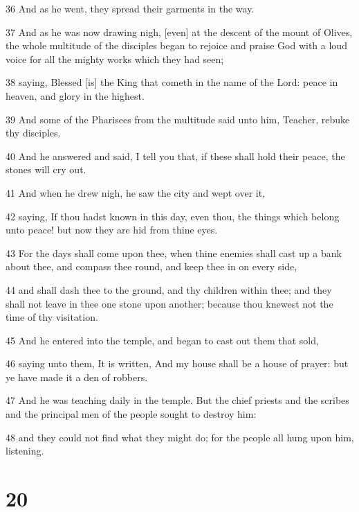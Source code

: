 \par 36 And as he went, they spread their garments in the way.
\par 37 And as he was now drawing nigh, [even] at the descent of the mount of Olives, the whole multitude of the disciples began to rejoice and praise God with a loud voice for all the mighty works which they had seen;
\par 38 saying, Blessed [is] the King that cometh in the name of the Lord: peace in heaven, and glory in the highest.
\par 39 And some of the Pharisees from the multitude said unto him, Teacher, rebuke thy disciples.
\par 40 And he answered and said, I tell you that, if these shall hold their peace, the stones will cry out.
\par 41 And when he drew nigh, he saw the city and wept over it,
\par 42 saying, If thou hadst known in this day, even thou, the things which belong unto peace! but now they are hid from thine eyes.
\par 43 For the days shall come upon thee, when thine enemies shall cast up a bank about thee, and compass thee round, and keep thee in on every side,
\par 44 and shall dash thee to the ground, and thy children within thee; and they shall not leave in thee one stone upon another; because thou knewest not the time of thy visitation.
\par 45 And he entered into the temple, and began to cast out them that sold,
\par 46 saying unto them, It is written, And my house shall be a house of prayer: but ye have made it a den of robbers.
\par 47 And he was teaching daily in the temple. But the chief priests and the scribes and the principal men of the people sought to destroy him:
\par 48 and they could not find what they might do; for the people all hung upon him, listening.

\chapter{20}

